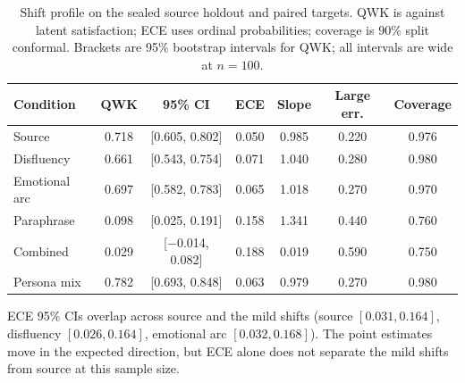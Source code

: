\documentclass[11pt,a4paper]{article}
\begin{document}
\begin{table}[t]
\centering
\caption{Shift profile on the sealed source holdout and paired targets. QWK is against latent
satisfaction; ECE uses ordinal probabilities; coverage is 90\% split conformal. Brackets are
95\% bootstrap intervals for QWK; all intervals are wide at $n=100$.}
\label{tab:shift}
\begin{threeparttable}
\small
\begin{tabular}{@{}lcccccc@{}}
\toprule
Condition & QWK & 95\% CI & ECE & Slope & Large err. & Coverage \\
\midrule
Source & 0.718 & [0.605, 0.802] & 0.050 & 0.985 & 0.220 & 0.976 \\
Disfluency & 0.661 & [0.543, 0.754] & 0.071 & 1.040 & 0.280 & 0.980 \\
Emotional arc & 0.697 & [0.582, 0.783] & 0.065 & 1.018 & 0.270 & 0.970 \\
Paraphrase & 0.098 & [0.025, 0.191] & 0.158 & 1.341 & 0.440 & 0.760 \\
Combined & 0.029 & [$-$0.014, 0.082] & 0.188 & 0.019 & 0.590 & 0.750 \\
Persona mix & 0.782 & [0.693, 0.848] & 0.063 & 0.979 & 0.270 & 0.980 \\
\bottomrule
\end{tabular}
\begin{tablenotes}\footnotesize
\item ECE 95\% CIs overlap across source and the mild shifts (source $[0.031,0.164]$,
disfluency $[0.026,0.164]$, emotional arc $[0.032,0.168]$). The point estimates move in the
expected direction, but ECE alone does not separate the mild shifts from source at this sample
size.
\end{tablenotes}
\end{threeparttable}
\end{table}
\end{document}
